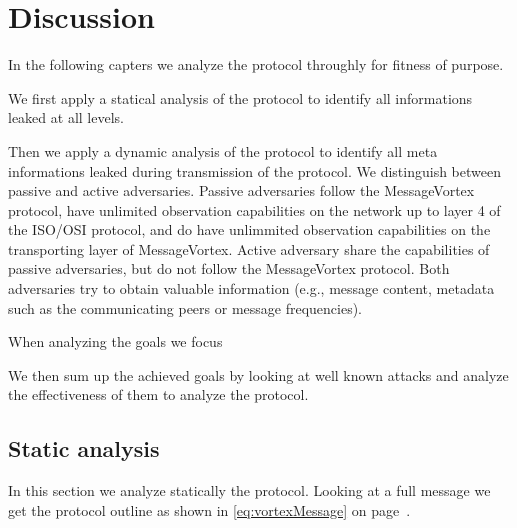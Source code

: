 
\part{Discussion \label{sec:discussion}}
In the following capters we analyze the protocol throughly for fitness of purpose. 

We first apply a statical analysis of the protocol to identify all informations leaked at all levels.

Then we apply a dynamic analysis of the protocol to identify all meta informations leaked during transmission of the protocol.
We distinguish between passive and active adversaries. Passive adversaries follow the MessageVortex protocol, have unlimited observation capabilities on the network up to layer 4 of the ISO/OSI protocol, and do have unlimmited observation capabilities on the transporting layer of MessageVortex. Active adversary share the capabilities of passive adversaries, but do not follow the MessageVortex protocol. Both adversaries try to obtain valuable information (e.g., message content, metadata such as the communicating peers or message frequencies).

When analyzing the goals we focus 

We then sum up the achieved goals by looking at well known attacks and analyze the effectiveness of them to analyze the protocol.

\chapter{Static analysis}
In this section we analyze statically the protocol. Looking at a full message we get the protocol outline as shown in \eqref{eq:vortexMessage} on page~\pageref{eq:vortexMessage}.

